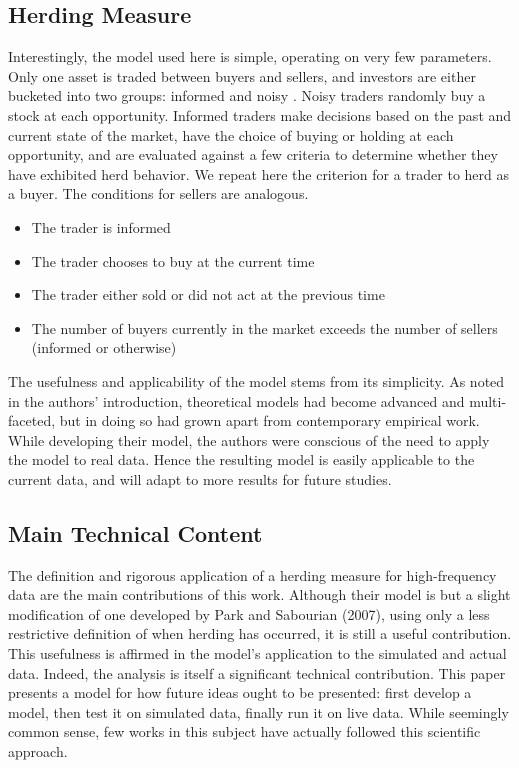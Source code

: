 \documentclass{article}
\begin{document}
\subsection{Herding Measure}  
  Interestingly, the model used here is simple, operating on very few parameters. 
  Only one asset is traded between buyers and sellers, and investors are either bucketed into two groups: informed and noisy \cite[5]{boortz}.
  Noisy traders randomly buy a stock at each opportunity.
  Informed traders make decisions based on the past and current state of the market, have the choice of buying or holding at each opportunity, and are evaluated against a few criteria to determine whether they have exhibited herd behavior.
  We repeat here the criterion for a trader to herd as a buyer.
  The conditions for sellers are analogous.
  \begin{itemize}
  \item 
    The trader is informed
  \item
    The trader chooses to buy at the current time
  \item 
    The trader either sold or did not act at the previous time
  \item 
    The number of buyers currently in the market exceeds the number of sellers (informed or otherwise)
  \end{itemize}
  The usefulness and applicability of the model stems from its simplicity. 
  As noted in the authors' introduction, theoretical models had become advanced and multi-faceted, but in doing so had grown apart from contemporary empirical work.
  While developing their model, the authors were conscious of the need to apply the model to real data.
  Hence the resulting model is easily applicable to the current data, and will adapt to more results for future studies.

\subsection{Main Technical Content}  
  The definition and rigorous application of a herding measure for high-frequency data are the main contributions of this work.
  Although their model is but a slight modification of one developed by Park and Sabourian (2007), using only a less restrictive definition of when herding has occurred, it is still a useful contribution.
  This usefulness is affirmed in the model's application to the simulated and actual data.
  Indeed, the analysis is itself a significant technical contribution.
  This paper presents a model for how future ideas ought to be presented: first develop a model, then test it on simulated data, finally run it on live data.
  While seemingly common sense, few works in this subject have actually followed this scientific approach.
\end{document}
